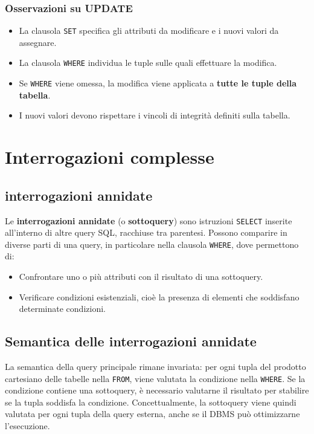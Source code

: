 \subsubsection*{Osservazioni su UPDATE}
\begin{itemize}
    \item La clausola \texttt{SET} specifica gli attributi da modificare e i nuovi valori da assegnare.

    \item La clausola \texttt{WHERE} individua le tuple sulle quali effettuare la modifica.

    \item Se \texttt{WHERE} viene omessa, la modifica viene applicata a \textbf{tutte le tuple della tabella}.

    \item I nuovi valori devono rispettare i vincoli di integrità definiti sulla tabella.
\end{itemize}

\section{Interrogazioni complesse}
\subsection{interrogazioni annidate}
Le \textbf{interrogazioni annidate} (o \textbf{sottoquery}) sono istruzioni \texttt{SELECT} inserite all'interno di altre query SQL, racchiuse tra parentesi.
Possono comparire in diverse parti di una query, in particolare nella clausola \texttt{WHERE}, dove permettono di:
\begin{itemize}
    \item Confrontare uno o più attributi con il risultato di una sottoquery.
    \item Verificare condizioni esistenziali, cioè la presenza di elementi che soddisfano determinate condizioni.
\end{itemize}
\subsection{Semantica delle interrogazioni annidate}
La semantica della query principale rimane invariata: per ogni tupla del prodotto cartesiano delle tabelle nella \texttt{FROM}, viene valutata la condizione nella \texttt{WHERE}.
Se la condizione contiene una sottoquery, è necessario valutarne il risultato per stabilire se la tupla soddisfa la condizione.
Concettualmente, la sottoquery viene quindi valutata per ogni tupla della query esterna, anche se il DBMS può ottimizzarne l'esecuzione.
